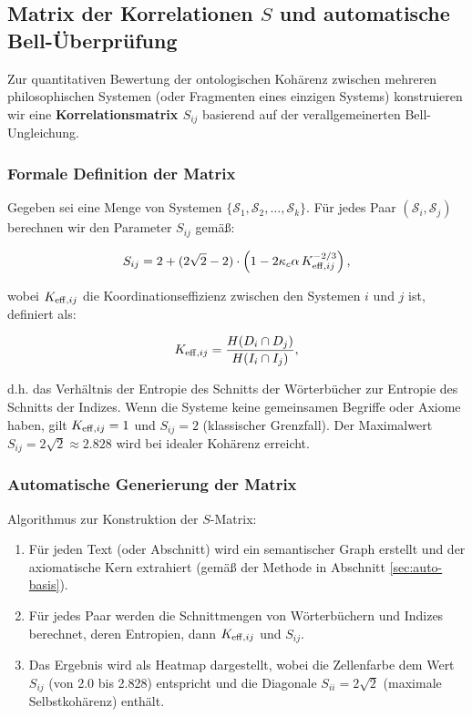 \documentclass[12pt,a4paper]{article}
\newcommand{\kappac}{\kappa_c}
\begin{document}
	\subsection{Matrix der Korrelationen \(S\) und automatische Bell-Überprüfung}
	\label{subsec:bell-matrix}
	
	Zur quantitativen Bewertung der ontologischen Kohärenz zwischen mehreren philosophischen Systemen (oder Fragmenten eines einzigen Systems) konstruieren wir eine \textbf{Korrelationsmatrix \(S_{ij}\)} basierend auf der verallgemeinerten Bell-Ungleichung.
	
	\subsubsection{Formale Definition der Matrix}
	
	Gegeben sei eine Menge von Systemen \(\{\mathcal{S}_1, \mathcal{S}_2, \dots, \mathcal{S}_k\}\). Für jedes Paar \((\mathcal{S}_i, \mathcal{S}_j)\) berechnen wir den Parameter \(S_{ij}\) gemäß:
	
	\[
	S_{ij} = 2 + (2\sqrt{2} - 2) \cdot \left(1 - 2\kappac \alpha \, \Keff[ij]^{-2/3}\right),
	\]
	
	wobei \(\Keff[ij]\) die Koordinationseffizienz zwischen den Systemen \(i\) und \(j\) ist, definiert als:
	
	\[
	\Keff[ij] = \frac{H(D_i \cap D_j)}{H(I_i \cap I_j)},
	\]
	
	d.h. das Verhältnis der Entropie des Schnitts der Wörterbücher zur Entropie des Schnitts der Indizes. Wenn die Systeme keine gemeinsamen Begriffe oder Axiome haben, gilt \(\Keff[ij] = 1\) und \(S_{ij} = 2\) (klassischer Grenzfall). Der Maximalwert \(S_{ij} = 2\sqrt{2} \approx 2.828\) wird bei idealer Kohärenz erreicht.
	
	\subsubsection{Automatische Generierung der Matrix}
	
	Algorithmus zur Konstruktion der \(S\)-Matrix:
	
	\begin{enumerate}
		\item Für jeden Text (oder Abschnitt) wird ein semantischer Graph erstellt und der axiomatische Kern extrahiert (gemäß der Methode in Abschnitt \ref{sec:auto-basis}).
		\item Für jedes Paar werden die Schnittmengen von Wörterbüchern und Indizes berechnet, deren Entropien, dann \(\Keff[ij]\) und \(S_{ij}\).
		\item Das Ergebnis wird als Heatmap dargestellt, wobei die Zellenfarbe dem Wert \(S_{ij}\) (von 2.0 bis 2.828) entspricht und die Diagonale \(S_{ii} = 2\sqrt{2}\) (maximale Selbstkohärenz) enthält.
	\end{enumerate}
	
\end{document}

